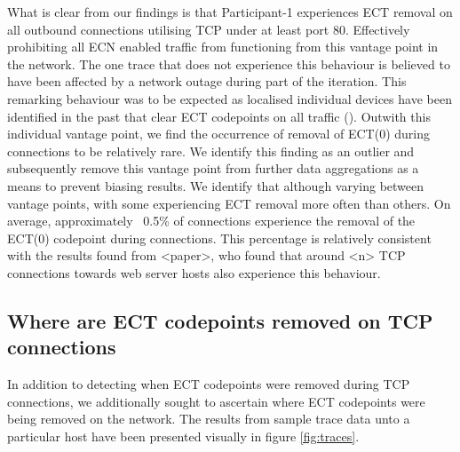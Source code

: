 \documentclass{l4proj}
\begin{document}
What is clear from our findings is that Participant-1 experiences ECT removal on all outbound connections utilising TCP under at least port 80. Effectively prohibiting all ECN enabled traffic from functioning from this vantage point in the network. The one trace that does not experience this behaviour is believed to have been affected by a network outage during part of the iteration. This remarking behaviour was to be expected as localised individual devices have been identified in the past that clear ECT codepoints on all traffic (\cite{bauer_measuring_2011}). Outwith this individual vantage point, we find the occurrence of removal of ECT(0) during connections to be relatively rare. We identify this finding as an outlier and subsequently remove this vantage point from further data aggregations as a means to prevent biasing results. We identify that although varying between vantage points, with some experiencing ECT removal more often than others. On average, approximately ~0.5\% of connections experience the removal of the ECT(0) codepoint during connections. This percentage is relatively consistent with the results found from <paper>, who found that around <n> TCP connections towards web server hosts also experience this behaviour.






\subsection{Where are ECT codepoints removed on TCP connections}

In addition to detecting when ECT codepoints were removed during TCP connections, we additionally sought to ascertain where ECT codepoints were being removed on the network. The results from sample trace data unto a particular host have been presented visually in figure \ref{fig:traces}.
\end{document}
